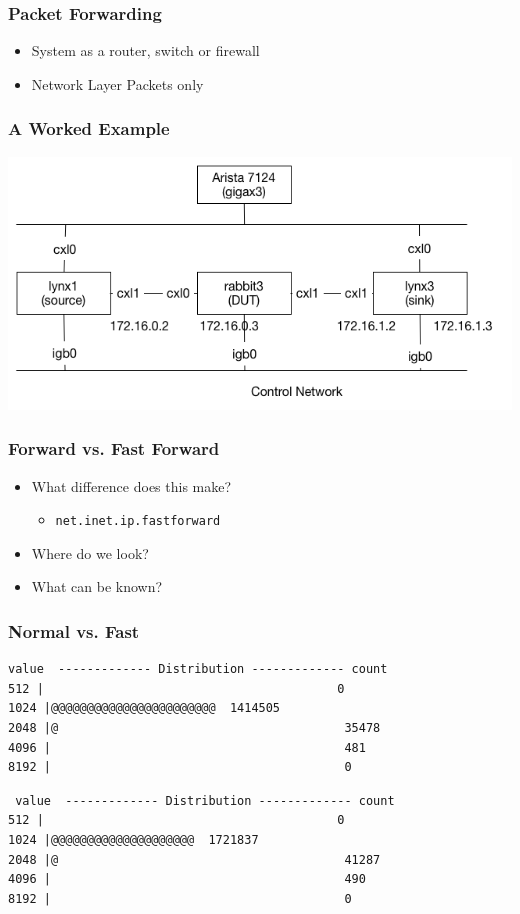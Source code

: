 \documentclass[pdftex]{beamer}
\begin{document}
\begin{frame}
  \frametitle{Packet Forwarding}
  \begin{itemize}
  \item System as a router, switch or firewall
  \item Network Layer Packets only
  \end{itemize}
\end{frame}

\begin{frame}
  \frametitle{A Worked Example}
      \includegraphics[width=\textwidth]{../figures/labsetup.png}
\end{frame}

\begin{frame}[fragile]
  \frametitle{Forward vs. Fast Forward}
  \begin{itemize}
  \item What difference does this make?
    \begin{itemize}
    \item \verb+net.inet.ip.fastforward+
    \end{itemize}
  \item Where do we look?
  \item What can be known?
  \end{itemize}
\end{frame}

\begin{frame}[fragile]
  \frametitle{Normal vs. Fast}
\begin{verbatim}
value  ------------- Distribution ------------- count    
512 |                                         0        
1024 |@@@@@@@@@@@@@@@@@@@@@@@  1414505  
2048 |@                                        35478    
4096 |                                         481      
8192 |                                         0        
\end{verbatim}

\begin{verbatim}
 value  ------------- Distribution ------------- count    
512 |                                         0        
1024 |@@@@@@@@@@@@@@@@@@@@  1721837  
2048 |@                                        41287    
4096 |                                         490      
8192 |                                         0        
\end{verbatim}
\end{frame}
\end{document}
